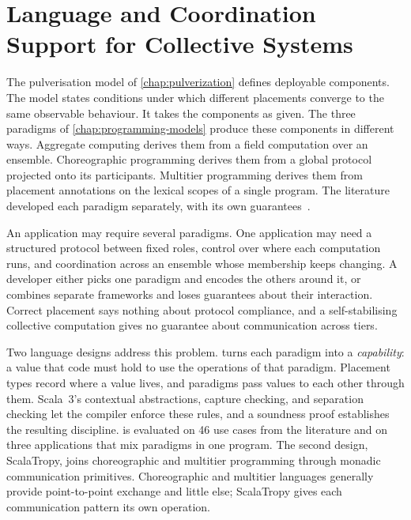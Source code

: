 \chapter{Language and Coordination Support for Collective Systems}
\label{chap:language-and-coordination}


The pulverisation model of \cref{chap:pulverization} defines deployable components.
The model states conditions under which different placements converge to the same observable behaviour.
It takes the components as given.
The three paradigms of \cref{chap:programming-models} produce these components in different ways.
Aggregate computing derives them from a field computation over an ensemble.
Choreographic programming derives them from a global protocol projected onto its participants.
Multitier programming derives them from placement annotations on the lexical scopes of a single program.
%
The literature developed each paradigm separately, with its own guarantees~\cite{DBLP:journals/csur/WeisenburgerWS20,DBLP:journals/csur/Casadei23}.

An application may require several paradigms.
%
One application may need a structured protocol between fixed roles,
control over where each computation runs,
and coordination across an ensemble whose membership keeps changing.
%
A developer either picks one paradigm and encodes the others around it,
or combines separate frameworks and loses guarantees about their interaction.
%
Correct placement says nothing about protocol compliance,
and a self-stabilising collective computation gives no guarantee about communication across tiers.

Two language designs address this problem.
%
\camil turns each paradigm into a \emph{capability}: a value that code must hold to use the operations of that paradigm.
%
Placement types record where a value lives, and paradigms pass values to each other through them.
%
Scala~3's contextual abstractions, capture checking, and separation checking let the compiler enforce these rules,
and a soundness proof establishes the resulting discipline.
%
\camil is evaluated on 46 use cases from the literature and on three applications that mix paradigms in one program.
%
The second design, ScalaTropy, joins choreographic and multitier programming through monadic communication primitives.
%
Choreographic and multitier languages generally provide point-to-point exchange and little else;
ScalaTropy gives each communication pattern its own operation.


